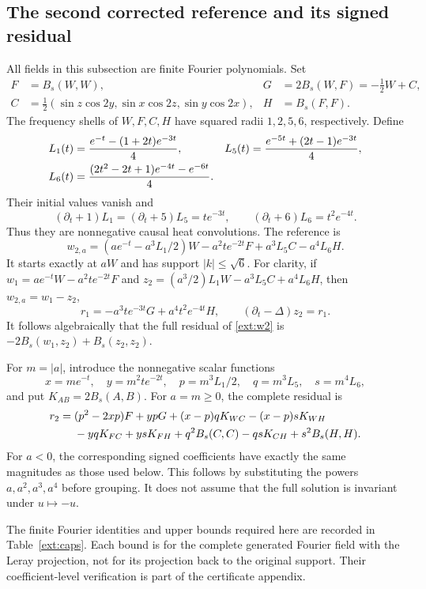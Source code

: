 \subsection{The second corrected reference and its signed residual}
\label{ext:reference}

All fields in this subsection are finite Fourier polynomials. Set
\begin{align*}
 F&=B_s(W,W),&
 G&=2B_s(W,F)=-\tfrac12W+C,\\
 C&=\tfrac12(\sin z\cos2y,\sin x\cos2z,\sin y\cos2x),&
 H&=B_s(F,F).
\end{align*}
The frequency shells of $W,F,C,H$ have squared radii $1,2,5,6$,
respectively. Define
\begin{align}
 L_1(t)&=\frac{e^{-t}-(1+2t)e^{-3t}}4,&
 L_5(t)&=\frac{e^{-5t}+(2t-1)e^{-3t}}4,\notag\\
 L_6(t)&=\frac{(2t^2-2t+1)e^{-4t}-e^{-6t}}4.
 \label{ext:profiles}
\end{align}
Their initial values vanish and
\[
 (\partial_t+1)L_1=(\partial_t+5)L_5=te^{-3t},\qquad
 (\partial_t+6)L_6=t^2e^{-4t}.
\]
Thus they are nonnegative causal heat convolutions. The reference is
\begin{equation}
 w_{2,a}=(ae^{-t}-a^3L_1/2)W-a^2te^{-2t}F
                +a^3L_5C-a^4L_6H.
 \label{ext:w2}
\end{equation}
It starts exactly at $aW$ and has support $|k|\le\sqrt6$.
For clarity, if $w_1=ae^{-t}W-a^2te^{-2t}F$ and
$z_2=(a^3/2)L_1W-a^3L_5C+a^4L_6H$, then $w_{2,a}=w_1-z_2$,
\[
 r_1=-a^3te^{-3t}G+a^4t^2e^{-4t}H,
 \qquad (\partial_t-\Delta)z_2=r_1.
\]
It follows algebraically that the full residual of \eqref{ext:w2} is
$-2B_s(w_1,z_2)+B_s(z_2,z_2)$.

For $m=|a|$, introduce the nonnegative scalar functions
\[
 x=me^{-t},\quad y=m^2te^{-2t},\quad
 p=m^3L_1/2,\quad q=m^3L_5,\quad s=m^4L_6,
\]
and put $K_{AB}=2B_s(A,B)$. For $a=m\ge0$, the complete residual is
\begin{align}
 r_2={}&(p^2-2xp)F+ypG+(x-p)qK_{WC}-(x-p)sK_{WH}\notag\\
       &-yqK_{FC}+ysK_{FH}+q^2B_s(C,C)
                       -qsK_{CH}+s^2B_s(H,H).
 \label{ext:residual}
\end{align}
For $a<0$, the corresponding signed coefficients have exactly the same
magnitudes as those used below. This follows by substituting the powers
$a,a^2,a^3,a^4$ before grouping. It does not assume that the full solution
is invariant under $u\mapsto-u$.

The finite Fourier identities and upper bounds required here are recorded
in Table~\ref{ext:caps}. Each bound is for the complete generated Fourier
field with the Leray projection, not for its projection back to the original
support. Their coefficient-level verification is part of the certificate
appendix.

